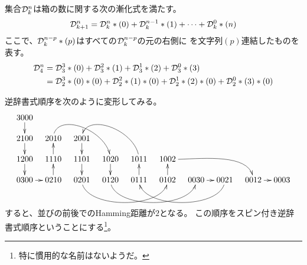 	集合${\mathcal{D}}_k^n$は箱の数に関する次の漸化式を満たす。
	\begin{equation*}\begin{split} %
		\mycal{D}_{k+1}^n = \mycal{D}_k^{n}*(0)
			+ \mycal{D}_k^{n-1}*(1) + \cdots + \mycal{D}_k^{0}*(n)
	\end{split}\end{equation*} %
	ここで、${\mathcal{D}}_k^{n-p}*(p)$はすべての${\mathcal{D}}_k^{n-p}$の元の右側に
	を文字列$(p)$連結したものを表す。
	\begin{equation*}\begin{split} %
		\mycal{D}_4^n 
		&= \mycal{D}_3^3*(0) + \mycal{D}_3^2*(1) + \mycal{D}_3^1*(2) 
			+ \mycal{D}_3^0*(3) \\
		&= \mycal{D}_2^3*(0)*(0) + \mycal{D}_2^2*(1)*(0)
			+ \mycal{D}_2^1*(2)*(0) + \mycal{D}_2^0*(3)*(0)
	\end{split}\end{equation*} %

	逆辞書式順序を次のように変形してみる。
	\begin{equation*}\xymatrix@R=3ex@C=2ex{
		3000 \ar[d] \\
		2100 \ar[d] & 2010 \ar@(u,u)[rrd] & 2001 \ar[d] \\
		1200 \ar[d] & 1110 \ar[u] & 1101 \ar[d] 
			& 1020 \ar[d] & 1011 \ar@(u,u)[llu] & 1002 \ar@(r,u)[rrrd] \\
		0300 \ar[r] & 0210 \ar[u] & 0201 \ar@(d,d)[rrr] & 0120 \ar@(d,d)[rrr]
			& 0111 \ar[u] & 0102 \ar[u] & 0030 \ar[r] & 0021 \ar@(d,d)[lll]
			& 0012 \ar[r] & 0003 \\
		\\
	}\end{equation*}
	すると、並びの前後でのHamming距離が$2$となる。
	この順序をスピン付き逆辞書式順序ということにする\footnote{
		特に慣用的な名前はないようだ。
	}。
\endgroup %

